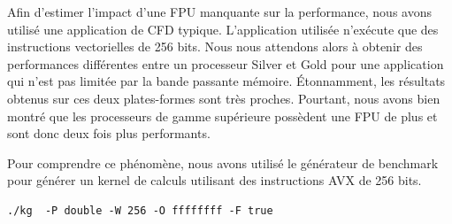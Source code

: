         \begin{table}[h!]
        \centering
        \caption{Skylake performance the HPL Benchmark in GFLOP/s: 8 process per core, HyperThreading off, frequency capped at 1.5 Ghz) \textbf{todo: refaire full core no capping}}
        \label{table:skl_bench}
        \end{table}
        
        
        Afin d'estimer l'impact d'une FPU manquante sur la performance, nous avons utilisé une application de CFD typique. L'application utilisée n'exécute que des instructions vectorielles de 256 bits. Nous nous attendons alors à obtenir des performances différentes entre un processeur Silver et Gold pour une application qui n'est pas limitée par la bande passante mémoire. Étonnamment, les résultats obtenus sur ces deux plates-formes sont très proches. Pourtant, nous avons bien montré que les processeurs de gamme supérieure possèdent une FPU de plus et sont donc deux fois plus performants. 

        Pour comprendre ce phénomène, nous avons utilisé le générateur de benchmark pour générer un kernel de calculs utilisant des instructions AVX de 256 bits.    


        \begin{verbatim}
./kg  -P double -W 256 -O ffffffff -F true
        \end{verbatim}
        
        \begin{table}[h!]
        \centering
        \caption{Xeon Gold and Silver results for AVX2 instructions}
        \label{table:skl_bench2}
        \end{table}
        
